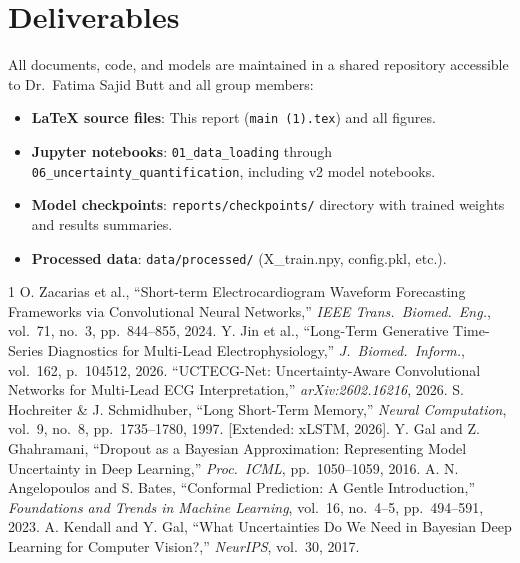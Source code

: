 \documentclass[10pt,journal,compsoc]{IEEEtran}
\begin{document}
\section{Deliverables}
All documents, code, and models are maintained in a shared repository accessible to Dr.\ Fatima Sajid Butt and all group members:
\begin{itemize}
    \item \textbf{LaTeX source files}: This report (\texttt{main (1).tex}) and all figures.
    \item \textbf{Jupyter notebooks}: \texttt{01\_data\_loading} through \texttt{06\_uncertainty\_quantification}, including v2 model notebooks.
    \item \textbf{Model checkpoints}: \texttt{reports/checkpoints/} directory with trained weights and results summaries.
    \item \textbf{Processed data}: \texttt{data/processed/} (X\_train.npy, config.pkl, etc.).
\end{itemize}

\begin{thebibliography}{1}
 O. Zacarias et al., ``Short-term Electrocardiogram Waveform Forecasting Frameworks via Convolutional Neural Networks,'' \emph{IEEE Trans.\ Biomed.\ Eng.}, vol.~71, no.~3, pp.~844--855, 2024.
 Y. Jin et al., ``Long-Term Generative Time-Series Diagnostics for Multi-Lead Electrophysiology,'' \emph{J.\ Biomed.\ Inform.}, vol.~162, p.~104512, 2026.
 ``UCTECG-Net: Uncertainty-Aware Convolutional Networks for Multi-Lead ECG Interpretation,'' \emph{arXiv:2602.16216}, 2026.
 S. Hochreiter \& J. Schmidhuber, ``Long Short-Term Memory,'' \emph{Neural Computation}, vol.~9, no.~8, pp.~1735--1780, 1997. [Extended: xLSTM, 2026].
 Y. Gal and Z. Ghahramani, ``Dropout as a Bayesian Approximation: Representing Model Uncertainty in Deep Learning,'' \emph{Proc.\ ICML}, pp.~1050--1059, 2016.
 A. N. Angelopoulos and S. Bates, ``Conformal Prediction: A Gentle Introduction,'' \emph{Foundations and Trends in Machine Learning}, vol.~16, no.~4--5, pp.~494--591, 2023.
 A. Kendall and Y. Gal, ``What Uncertainties Do We Need in Bayesian Deep Learning for Computer Vision?,'' \emph{NeurIPS}, vol.~30, 2017.
\end{thebibliography}
\end{document}
